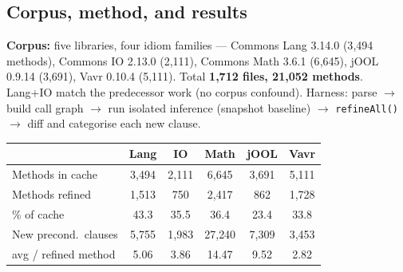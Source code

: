 \documentclass[11pt]{article}
\begin{document}
\subsection{Corpus, method, and results}

\textbf{Corpus:} five libraries, four idiom families --- Commons Lang 3.14.0
(3{,}494 methods), Commons IO 2.13.0 (2{,}111), Commons Math 3.6.1 (6{,}645),
jOOL 0.9.14 (3{,}691), Vavr 0.10.4 (5{,}111). Total \textbf{1{,}712 files,
21{,}052 methods}. Lang+IO match the predecessor work (no corpus confound).
Harness: parse $\to$ build call graph $\to$ run isolated inference (snapshot
baseline) $\to$ \texttt{refineAll()} $\to$ diff and categorise each new clause.

\begin{center}
\begin{tabular}{lccccc}
\toprule
 & \textbf{Lang} & \textbf{IO} & \textbf{Math} & \textbf{jOOL} & \textbf{Vavr}\\
\midrule
Methods in cache        & 3{,}494 & 2{,}111 & 6{,}645 & 3{,}691 & 5{,}111\\
Methods refined         & 1{,}513 & 750     & 2{,}417 & 862     & 1{,}728\\
\% of cache             & 43.3 & 35.5 & 36.4 & 23.4 & 33.8\\
New precond.\ clauses   & 5{,}755 & 1{,}983 & 27{,}240 & 7{,}309 & 3{,}453\\
avg / refined method    & 5.06 & 3.86 & 14.47 & 9.52 & 2.82\\
\bottomrule
\end{tabular}
\end{center}
\end{document}
